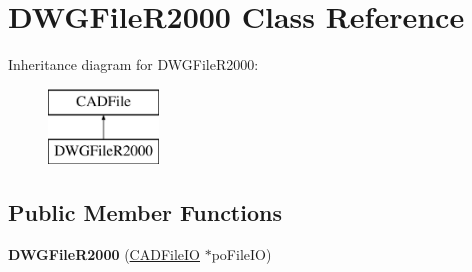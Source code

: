 \hypertarget{class_d_w_g_file_r2000}{}\section{D\+W\+G\+File\+R2000 Class Reference}
\label{class_d_w_g_file_r2000}
Inheritance diagram for D\+W\+G\+File\+R2000\+:\begin{figure}[H]
\begin{center}
\leavevmode
\includegraphics[height=2.000000cm]{class_d_w_g_file_r2000}
\end{center}
\end{figure}
\subsection*{Public Member Functions}
\begin{DoxyCompactItemize}
\item 
{\bfseries D\+W\+G\+File\+R2000} (\hyperlink{class_c_a_d_file_i_o}{C\+A\+D\+File\+IO} $\ast$po\+File\+IO)\hypertarget{class_d_w_g_file_r2000_aaa1057df3d7caf7e1d3463cbade38fce}{}\label{class_d_w_g_file_r2000_aaa1057df3d7caf7e1d3463cbade38fce}

\end{DoxyCompactItemize}
